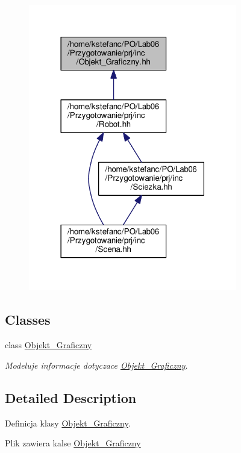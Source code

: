 \begin{figure}[H]
\begin{center}
\leavevmode
\includegraphics[width=258pt]{_objekt___graficzny_8hh__dep__incl}
\end{center}
\end{figure}
\subsection*{Classes}
\begin{DoxyCompactItemize}
\item 
class \hyperlink{class_objekt___graficzny}{Objekt\+\_\+\+Graficzny}
\begin{DoxyCompactList}\small\item\em Modeluje informacje dotyczace \hyperlink{class_objekt___graficzny}{Objekt\+\_\+\+Graficzny}. \end{DoxyCompactList}\end{DoxyCompactItemize}


\subsection{Detailed Description}
Definicja klasy \hyperlink{class_objekt___graficzny}{Objekt\+\_\+\+Graficzny}. 

Plik zawiera kalse \hyperlink{class_objekt___graficzny}{Objekt\+\_\+\+Graficzny} 
